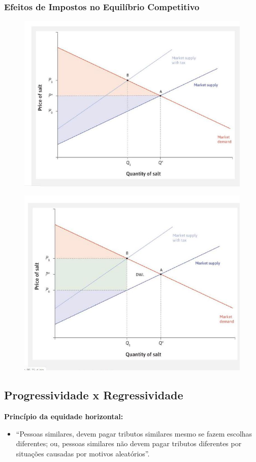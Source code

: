\documentclass[a4paper,12pt]{article}[abntex2]
\begin{document}
\subsubsection{\textbf{Efeitos de Impostos no Equilíbrio Competitivo}}
\begin{figure}[H]
    \centering
    \includegraphics[width=0.7\linewidth]{Imagens/a18i7.png}
\end{figure}

\begin{figure}[H]
    \centering
    \includegraphics[width=0.7\linewidth]{Imagens/a18i8.png}
\end{figure}

\subsection{\textbf{Progressividade x Regressividade}}
\textbf{Princípio da equidade horizontal:}
\begin{itemize}
  \item ``Pessoas similares, devem pagar tributos similares mesmo se fazem escolhas diferentes; ou, pessoas similares não devem pagar tributos diferentes por situações causadas por motivos aleatórios''.
\end{itemize}
\end{document}
